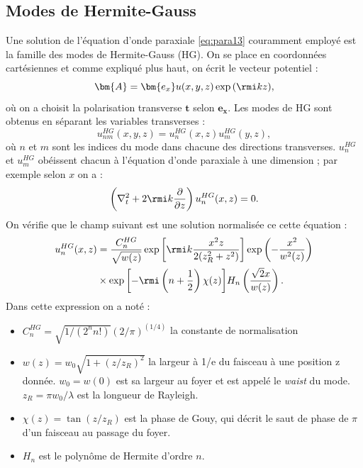 \subsection{Modes de Hermite-Gauss}
Une solution de l'équation d'onde paraxiale \ref{eq:para13} couramment employé est la famille des modes de Hermite-Gauss (HG). On se place en coordonnées cartésiennes et comme expliqué plus haut, on écrit le vecteur potentiel :
\begin{equation*}
\bm{A}=\bm{e_x}u(x,y,z)\exp{(\rmi k z)},
\end{equation*}
où on a choisit la polarisation transverse $\bm{t}$ selon $\bm{e_x}$. Les modes de HG sont obtenus en séparant les variables transverses :
\begin{equation*}
u^{HG}_{nm}(x,y,z)=u^{HG}_{n}(x,z)u^{HG}_{m}(y,z),
\end{equation*}
où $n$ et $m$ sont les indices du mode dans chacune des directions transverses. $u^{HG}_{n}$ et $u^{HG}_{m}$ obéissent chacun à l'équation d'onde paraxiale à une dimension ; par exemple selon $x$ on a :
\begin{equation*}
\left(\nabla_t^2 +2\rmi k\frac{\partial}{\partial z}\right)u^{HG}_{n}(x,z)=0.
\end{equation*}
On vérifie que le champ suivant est une solution normalisée ce cette équation :
\begin{align}
u^{HG}_{n}(x,z)&=\frac{C_n^{HG}}{\sqrt{w(z)}}\exp{\left[\rmi k \frac{x^2 z}{2(z_R^2 + z^2)}\right]}\exp{\left(-\frac{x^2}{w^2(z)}\right)}\\
&\times \exp{\left[-\rmi\left(n+\frac{1}{2}\right)\chi(z)\right]}H_n\left(\frac{\sqrt{2}x}{w(z)}\right).
\label{eq:hgmodes}
\end{align}
Dans cette expression on a noté :
\begin{itemize}
\renewcommand{\labelitemi}{$\bullet$}
\setlength\itemsep{1em}

\item $C_n^{HG}=\sqrt{1/(2^n n!)}(2/\pi)^{(1/4)}$ la constante de normalisation
\item $w(z) = w_0 \sqrt{1+(z/z_R)^2}$ la largeur à 1/e du faisceau à une position z donnée. $w_0=w(0)$ est sa largeur au foyer et est appelé le \textit{waist} du mode. $z_R = \pi w_0/\lambda$ est la longueur de Rayleigh.
\item $\chi(z)=\tan{(z/z_R)}$ est la phase de Gouy, qui décrit le saut de phase de $\pi$ d'un faisceau au passage du foyer.
\item $H_n$ est le polynôme de Hermite d'ordre $n$.
\end{itemize}


